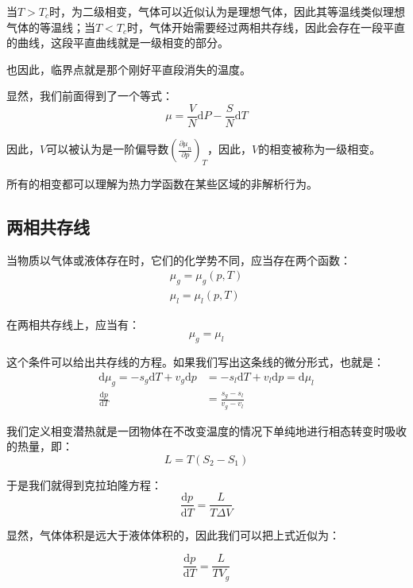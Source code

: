 \documentclass[a4paper, 10pt, openany]{book}%
\begin{document}
当$T>T_c$时，为二级相变，气体可以近似认为是理想气体，因此其等温线类似理想气体的等温线；当$T<T_c$时，气体开始需要经过两相共存线，因此会存在一段平直的曲线，这段平直曲线就是一级相变的部分。

也因此，临界点就是那个刚好平直段消失的温度。

显然，我们前面得到了一个等式：
\begin{equation}
  \mu=\frac{V}{N}\mathrm{d}P-\frac{S}{N}\mathrm{d}T\end{equation}

因此，$V$可以被认为是一阶偏导数$\left(\frac{\partial \mu_n}{\partial p}\right)_T$，因此，$V$的相变被称为一级相变。

所有的相变都可以理解为热力学函数在某些区域的非解析行为。


\subsection{两相共存线}
当物质以气体或液体存在时，它们的化学势不同，应当存在两个函数：
\begin{align}
  \mu_g=\mu_g(p,T)\\
  \mu_l=\mu_l(p,T)
\end{align}

在两相共存线上，应当有：
\begin{equation}
  \mu_g=\mu_l
\end{equation}

这个条件可以给出共存线的方程。如果我们写出这条线的微分形式，也就是：
\begin{align}
  \mathrm{d}\mu_g=-s_g\mathrm{d}T+v_g\mathrm{d}p&=-s_l\mathrm{d}T+v_l\mathrm{d}p=\mathrm{d}\mu_l     \\
  \frac{\mathrm{d}p}{\mathrm{d}T}&=\frac{s_g-s_l}{v_g-v_l}
\end{align}

我们定义相变潜热就是一团物体在不改变温度的情况下单纯地进行相态转变时吸收的热量，即：
\begin{equation}
  L=T(S_2-S_1)
\end{equation}

于是我们就得到克拉珀隆方程：
\begin{equation}
  \frac{\mathrm{d}p}{\mathrm{d}T}=\frac{L}{T\Delta V}
\end{equation}

显然，气体体积是远大于液体体积的，因此我们可以把上式近似为：

\begin{equation}
  \frac{\mathrm{d}p}{\mathrm{d}T}=\frac{L}{T V_g}
\end{equation}
\end{document}
